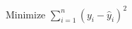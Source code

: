 \documentclass[preview]{standalone}
\begin{document}
\begin{align*}
\text{Minimize } \sum_{i=1}^{n} (y_i - \hat{y}_i)^2
\end{align*}
\end{document}
